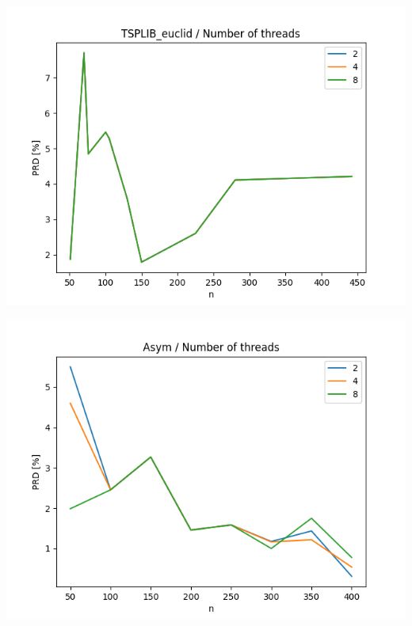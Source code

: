 \documentclass{article}
\begin{document}
\begin{center}
\includegraphics[width=\textwidth, 
                   height = 0.4\textheight, 
                   keepaspectratio]
                  {plots/tsplib_euclid_12_num_of_threads} 
\end{center}

\begin{center}
\includegraphics[width=\textwidth, 
                   height = 0.4\textheight, 
                   keepaspectratio]
                  {plots/asym_12_num_of_threads} 
\end{center}
\end{document}
